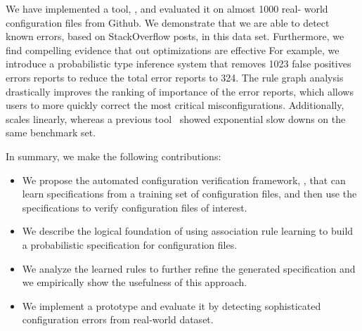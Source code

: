 We have implemented a tool, \app, and evaluated it on almost 1000 real-
world configuration files from Github.
We demonstrate that we are able to detect known errors, based on 
StackOverflow posts, in this data set.
Furthermore, we find compelling evidence that out optimizations are 
effective
For example, we introduce a probabilistic type inference system that removes 1023 false 
positives errors reports to reduce the total error reports to 324.
The rule graph analysis drastically improves the ranking of importance of 
the error reports, which allows users to more quickly correct the most 
critical misconfigurations.
Additionally, \app scales linearly, whereas 
a previous tool~\cite{santolucitoCAV} showed exponential slow downs on 
the same benchmark set.

In summary, we make the following contributions:
\begin{itemize}
\item We propose the automated configuration verification
framework, \app, that can learn specifications from a training set
of configuration files, and then use the specifications to verify 
configuration files of interest.
\item We describe the logical foundation of using association rule learning to build a probabilistic specification for configuration files. 
\item We analyze the learned rules to further refine the generated specification and we empirically show the usefulness of this approach.
\item We implement a \app prototype and evaluate it by
detecting sophisticated configuration errors 
from real-world dataset.

\end{itemize}



